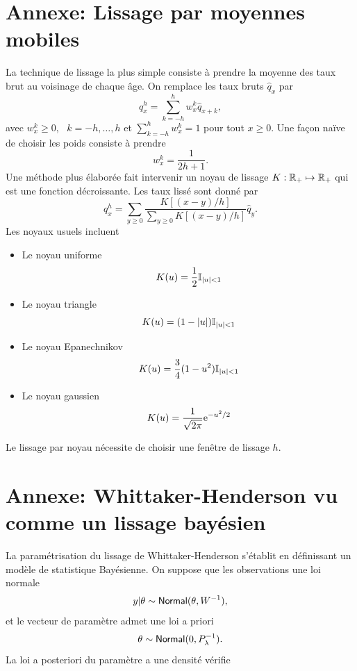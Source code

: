 \section{Annexe: Lissage par moyennes mobiles}
La technique de lissage la plus simple consiste à prendre la moyenne des taux brut au voisinage de chaque âge. On remplace les taux bruts $\widehat{q}_x$ par 
$$
q^h_x = \sum_{k = -h}^h w_{x}^k \widehat{q}_{x+k} ,
$$
avec $w_x^k\geq 0,\text{ }k=-h,\ldots, h$ et $\sum_{k=-h}^{h} w_x^k = 1$ pour tout $x\geq 0$. Une façon naïve de choisir les poids consiste à prendre 
$$
w_x^k = \frac{1}{2h+1}.
$$
Une méthode plus élaborée fait intervenir un noyau de lissage $K:\mathbb{R}_+\mapsto \mathbb{R}_+$ qui est une fonction décroissante. Les taux lissé sont donné par 
$$
q^h_x = \sum_{y\geq0} \frac{K[(x-y)/h]}{\sum_{y\geq 0}K[(x-y)/h]}\widehat{q}_y.
$$
Les noyaux usuels incluent
\begin{itemize}
  \item Le noyau uniforme
  $$
K(u) = \frac{1}{2}\mathbb{I}_{|u|<1}
  $$
  \item Le noyau triangle 
  $$
  K(u) = (1-|u|)\mathbb{I}_{|u|<1}
  $$
  \item Le noyau Epanechnikov 
  $$
  K(u) = \frac{3}{4}(1-u^2)\mathbb{I}_{|u|<1}
  $$
  \item Le noyau gaussien 
  $$
  K(u) = \frac{1}{\sqrt{2\pi}}\mathrm{e}^{-u^2/2}
  $$
\end{itemize}
Le lissage par noyau nécessite de choisir une fenêtre de lissage $h$.

\section{Annexe: Whittaker-Henderson vu comme un lissage bayésien}\label{app:WH}
La paramétrisation du lissage de Whittaker-Henderson s'établit en  définissant un modèle de statistique Bayésienne. On suppose que les observations une loi normale
$$
y|\theta \sim \mathsf{Normal}(\theta,W^{-1}),
$$
et le vecteur de paramètre admet une loi a priori 
$$
\theta\sim \mathsf{Normal}(0,P_{\lambda}^{-1}).
$$
La loi a posteriori du paramètre a une densité vérifie

